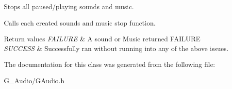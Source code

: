 Stops all paused/playing sounds and music. 

Calls each created sound\textquotesingle{}s and music stop function. 
\begin{DoxyRetVals}{Return values}
{\em F\+A\+I\+L\+U\+RE} & A sound or Music returned F\+A\+I\+L\+U\+RE \\
\hline
{\em S\+U\+C\+C\+E\+SS} & Successfully ran without running into any of the above issues. \\
\hline
\end{DoxyRetVals}


The documentation for this class was generated from the following file\+:\begin{DoxyCompactItemize}
\item 
G\+\_\+\+Audio/G\+Audio.\+h\end{DoxyCompactItemize}
